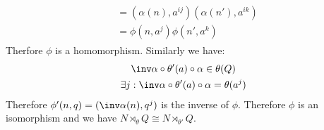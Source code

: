 \begin{enumerate}[label=\ilabel]
\begin{gather*}
\begin{split}
                &= (\alpha(n), a^{ij}) (\alpha(n'), a^{ik}) \\
                &= \phi(n, a^j) \phi(n', a^k)
            \end{split}
        \end{gather*}
        Therfore $\phi$ is a homomorphism. Similarly we have:
        \begin{gather*}
            \inv \alpha \circ \theta'(a) \circ \alpha \in \theta(Q) \\
            \exists j: \inv \alpha \circ \theta'(a) \circ \alpha = \theta(a^j)
        \end{gather*}
        Therefore $\phi'(n, q) = (\inv \alpha(n), q^j)$ is the inverse of $\phi$. Therefore $\phi$ is an isomorphism and we have $N \rtimes_\theta Q \cong N \rtimes_{\theta'} Q$.
\end{enumerate}